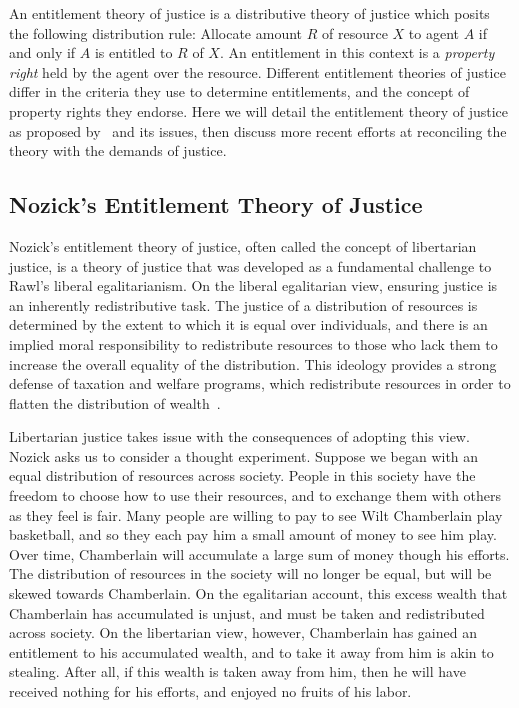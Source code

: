 An entitlement theory of justice is a distributive theory of justice which
posits the following distribution rule: Allocate amount $R$ of resource $X$ to 
agent $A$ if and only if $A$ is entitled to $R$ of $X$. An entitlement in this
context is a \textit{property right} held by the agent over the resource. 
Different entitlement theories of justice differ in the criteria they use to 
determine entitlements, and the concept of property rights they endorse.
Here we will detail the entitlement theory of justice as proposed
by~\cite{Nozick_1974} and its issues, then discuss more recent efforts at 
reconciling the theory with the demands of justice.

\subsection{Nozick's Entitlement Theory of Justice}

Nozick's entitlement theory of justice, often called the concept of libertarian
justice, is a theory of justice that was developed as a fundamental challenge to
Rawl's liberal egalitarianism. On the liberal egalitarian view, ensuring justice
is an inherently redistributive task. The justice of a distribution of resources
is determined by the extent to which it is equal over individuals, and there is
an implied moral responsibility to redistribute resources to those who lack them
to increase the overall equality of the distribution. This ideology provides a
strong defense of taxation and welfare programs, which redistribute resources
in order to flatten the distribution of wealth~\cite{Rawls_1971}.

Libertarian justice takes issue with the consequences of adopting this view.
Nozick asks us to consider a thought experiment. Suppose we began with an equal
distribution of resources across society. People in this society have the
freedom to choose how to use their resources, and to exchange them with others 
as they feel is fair. Many people are willing to pay to see Wilt Chamberlain 
play basketball, and so they each pay him a small amount of money to see him 
play. Over time, Chamberlain will accumulate a large sum of money though his 
efforts. The distribution of resources in the society will no longer be equal,
but will be skewed towards Chamberlain. On the egalitarian account, this excess 
wealth that Chamberlain has accumulated is unjust, and must be taken and
redistributed across society. On the libertarian view, however, Chamberlain has
gained an entitlement to his accumulated wealth, and to take it away from him
is akin to stealing. After all, if this wealth is taken away from him, then he
will have received nothing for his efforts, and enjoyed no fruits of his labor.

